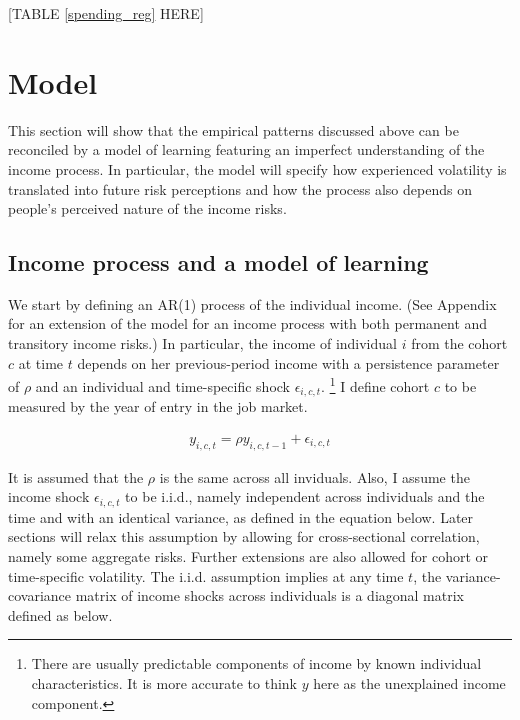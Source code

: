 \documentclass[12pt,notitlepage,onecolumn,aps,pra]{article}
\begin{document}
{[}TABLE \ref{spending_reg} HERE{]}



    \hypertarget{model}{%
\section{Model}\label{model}}

This section will show that the empirical patterns discussed above can
be reconciled by a model of learning featuring an imperfect
understanding of the income process. In particular, the model will
specify how experienced volatility is translated into future risk
perceptions and how the process also depends on people's perceived
nature of the income risks.

\hypertarget{income-process-and-a-model-of-learning}{%
\subsection{Income process and a model of
learning}\label{income-process-and-a-model-of-learning}}

We start by defining an AR(1) process of the individual income. (See
Appendix for an extension of the model for an income process with both
permanent and transitory income risks.) In particular, the income of
individual \(i\) from the cohort \(c\) at time \(t\) depends on her
previous-period income with a persistence parameter of \(\rho\) and an
individual and time-specific shock \(\epsilon_{i,c,t}\).
\footnote{There are usually predictable components of income by known individual characteristics. It is more accurate to think $y$ here as the unexplained income component. }
I define cohort \(c\) to be measured by the year of entry in the job
market.

\begin{eqnarray}
y_{i,c,t} = \rho y_{i,c,t-1} + \epsilon_{i,c,t}
\end{eqnarray}

It is assumed that the \(\rho\) is the same across all inviduals. Also,
I assume the income shock \(\epsilon_{i,c,t}\) to be i.i.d., namely
independent across individuals and the time and with an identical
variance, as defined in the equation below. Later sections will relax
this assumption by allowing for cross-sectional correlation, namely some
aggregate risks. Further extensions are also allowed for cohort or
time-specific volatility. The i.i.d. assumption implies at any time
\(t\), the variance-covariance matrix of income shocks across
individuals is a diagonal matrix defined as below.
\end{document}
